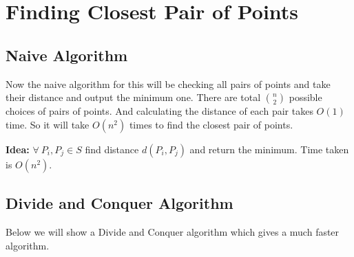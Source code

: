 \chapter{Finding Closest Pair of Points}
\begin{algoprob}
\end{algoprob}

\section{Naive Algorithm}

Now the naive algorithm for this will be checking all pairs of points and take their distance and output the minimum one. There are total $\binom{n }{2}$ possible choices of pairs of points. And calculating the distance of each pair takes $O(1)$ time. So it will take $O(n^2)$ times to find the closest pair of points. \parinf

\textbf{Idea:} $\forall\ P_i,P_j\in S$ find distance $d(P_i,P_j)$ and return the minimum. Time taken is $O(n^2)$. 

\section{Divide and Conquer Algorithm}
Below we will show a Divide and Conquer algorithm which gives a much faster algorithm. 

